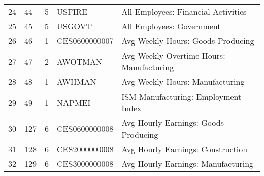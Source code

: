 \begin{table}[ht]
\begin{tabular}{lllll}
24 & 44 & 5 & USFIRE & All Employees: Financial Activities \\
25 & 45 & 5 & USGOVT & All Employees: Government \\
26 & 46 & 1 & CES0600000007 & Avg Weekly Hours: Goods-Producing \\
27 & 47 & 2 & AWOTMAN & Avg Weekly Overtime Hours: Manufacturing \\
28 & 48 & 1 & AWHMAN & Avg Weekly Hours: Manufacturing \\
\rowcolor{gray} 29 & 49 & 1 & NAPMEI & ISM Manufacturing: Employment Index \\
30 & 127 & 6 & CES0600000008 & Avg Hourly Earnings: Goods-Producing \\
31 & 128 & 6 & CES2000000008 & Avg Hourly Earnings: Construction \\
32 & 129 & 6 & CES3000000008 & Avg Hourly Earnings: Manufacturing \\

\bottomrule
\end{tabular}  
\end{table} 